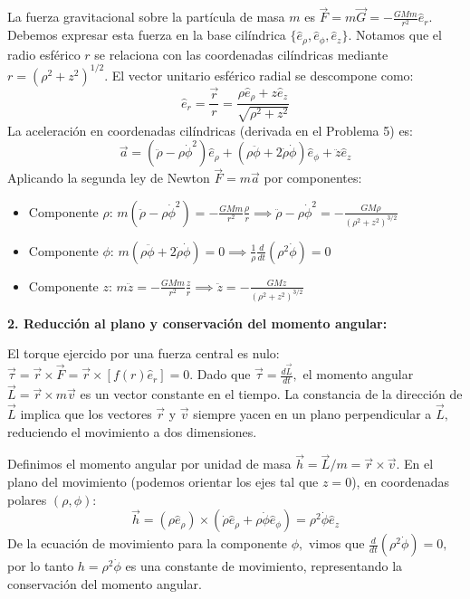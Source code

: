 \documentclass[a4paper]{article}
\begin{document}
La fuerza gravitacional sobre la partícula de masa $m$ es $\vec{F} = m\vec{G} = -\frac{GMm}{r^2}\hat{e}_r.$ Debemos expresar esta fuerza en la base cilíndrica $\{\hat{e}_\rho, \hat{e}_\phi, \hat{e}_z\}.$ Notamos que el radio esférico $r$ se relaciona con las coordenadas cilíndricas mediante $r = (\rho^2 + z^2)^{1/2}.$ El vector unitario esférico radial se descompone como:
\begin{equation}
\hat{e}_r = \frac{\vec{r}}{r} = \frac{\rho \hat{e}_\rho + z \hat{e}_z}{\sqrt{\rho^2 + z^2}}
\end{equation}
La aceleración en coordenadas cilíndricas (derivada en el Problema 5) es:
\begin{equation}
\vec{a} = (\ddot{\rho} - \rho\dot{\phi}^2)\hat{e}_\rho + (\rho\ddot{\phi} + 2\dot{\rho}\dot{\phi})\hat{e}_\phi + \ddot{z}\hat{e}_z
\end{equation}
Aplicando la segunda ley de Newton $\vec{F} = m\vec{a}$ por componentes:
\begin{itemize}
    \item Componente $\rho$: $m(\ddot{\rho} - \rho\dot{\phi}^2) = -\frac{GMm}{r^2} \frac{\rho}{r} \implies \ddot{\rho} - \rho\dot{\phi}^2 = -\frac{GM\rho}{(\rho^2 + z^2)^{3/2}}$
    \item Componente $\phi$: $m(\rho\ddot{\phi} + 2\dot{\rho}\dot{\phi}) = 0 \implies \frac{1}{\rho}\frac{d}{dt}(\rho^2\dot{\phi}) = 0$
    \item Componente $z$: $m\ddot{z} = -\frac{GMm}{r^2} \frac{z}{r} \implies \ddot{z} = -\frac{GMz}{(\rho^2 + z^2)^{3/2}}$
\end{itemize}

\textbf{2. Reducción al plano y conservación del momento angular:}

El torque ejercido por una fuerza central es nulo: $\vec{\tau} = \vec{r} \times \vec{F} = \vec{r} \times [f(r)\hat{e}_r] = 0.$ Dado que $\vec{\tau} = \frac{d\vec{L}}{dt},$ el momento angular $\vec{L} = \vec{r} \times m\vec{v}$ es un vector constante en el tiempo. La constancia de la dirección de $\vec{L}$ implica que los vectores $\vec{r}$ y $\vec{v}$ siempre yacen en un plano perpendicular a $\vec{L},$ reduciendo el movimiento a dos dimensiones. 

Definimos el momento angular por unidad de masa $\vec{h} = \vec{L}/m = \vec{r} \times \vec{v}.$ En el plano del movimiento (podemos orientar los ejes tal que $z=0$), en coordenadas polares $(\rho, \phi)$:
\begin{equation}
\vec{h} = (\rho \hat{e}_\rho) \times (\dot{\rho}\hat{e}_\rho + \rho\dot{\phi}\hat{e}_\phi) = \rho^2\dot{\phi}\hat{e}_z
\end{equation}
De la ecuación de movimiento para la componente $\phi,$ vimos que $\frac{d}{dt}(\rho^2\dot{\phi}) = 0,$ por lo tanto $h = \rho^2\dot{\phi}$ es una constante de movimiento, representando la conservación del momento angular.
\end{document}
